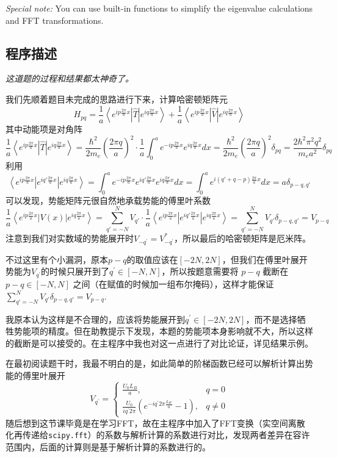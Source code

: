 \noindent \textit{Special note:} You can use built-in functions to simplify the eigenvalue calculations and FFT transformations.


\subsection{程序描述}
\textit{这道题的过程和结果都太神奇了。}

我们先顺着题目未完成的思路进行下来，计算哈密顿矩阵元
\[
H_{pq} = \frac{1}{a}\left\langle e^{ip\frac{2\pi}{a}x} \left| \hat{T} \right| e^{iq\frac{2\pi}{a}x} \right\rangle + \frac{1}{a}\left\langle e^{ip\frac{2\pi}{a}x} \left| \hat{V} \right| e^{iq\frac{2\pi}{a}x} \right\rangle
\]
其中动能项是对角阵
\[
    \frac{1}{a}\left\langle e^{ip\frac{2\pi}{a}x} \left| \hat{T} \right| e^{iq\frac{2\pi}{a}x} \right\rangle = \frac{\hbar^2}{2 m_e} \left( \frac{2\pi q}{a} \right)^2 \cdot\frac{1}{a}\int_0^a e^{-ip\frac{2\pi}{a}x} e^{iq\frac{2\pi}{a}x} dx= \frac{\hbar^2}{2 m_e} \left( \frac{2\pi q}{a} \right)^2 \delta_{pq} = \frac{2 \hbar^2 \pi^2 q^2}{m_e a^2} \delta_{pq}
\]
利用
\[
\left\langle e^{ip\frac{2\pi}{a}x} \left| e^{iq'\frac{2\pi}{a}x} \right| e^{iq\frac{2\pi}{a}x} \right\rangle = \int_0^a e^{-ip\frac{2\pi}{a}x} e^{iq'\frac{2\pi}{a}x} e^{iq\frac{2\pi}{a}x} dx = \int_0^a e^{i(q' + q - p)\frac{2\pi}{a}x} dx = a \delta_{p - q, q'}
\]
可以发现，势能矩阵元很自然地承载势能的傅里叶系数
\[
    \frac{1}{a}\left\langle e^{ip\frac{2\pi}{a}x} \left| V(x) \right| e^{iq\frac{2\pi}{a}x} \right\rangle = \sum_{q'=-N}^N V_{q'} \cdot \frac{1}{a} \left\langle e^{ip\frac{2\pi}{a}x} \left| e^{iq'\frac{2\pi}{a}x} \right| e^{iq\frac{2\pi}{a}x} \right\rangle=\sum_{q'=-N}^N V_{q'} \delta_{p - q, q'} = V_{p - q}
\]
注意到我们对实数域的势能展开时$V_{-q^{\prime}}=V_{-q^{\prime}}^{*}$，所以最后的哈密顿矩阵是厄米阵。


不过这里有个小漏洞，原本$p - q$的取值应该在$[-2N,2N]$，但我们在傅里叶展开势能为$V_{q^\prime}$的时候只展开到了$q^\prime \in [-N,N]$，所以按题意需要将 $p - q$ 截断在$ p - q  \in [-N,N]$ 之间（在赋值的时候加一组布尔掩码），这样才能保证$\sum_{q'=-N}^N V_{q'} \delta_{p - q, q'} = V_{p - q}.$

我原本认为这样是不合理的，应该将势能展开到$q^\prime \in [-2N,2N]$，而不是选择牺牲势能项的精度。但在助教提示下发现，本题的势能项本身影响就不大，所以这样的截断是可以接受的。在主程序中我也对这一点进行了对比论证，详见结果示例。

在最初阅读题干时，我最不明白的是，如此简单的阶梯函数已经可以解析计算出势能的傅里叶展开
\[
V_{q^{\prime}}=\begin{cases}\frac{U_0L_B}{a},&q=0\\\frac{U_0}{i{q^{\prime}}2\pi}\left(e^{-i{q^{\prime}}2\pi\frac{L_W}{a}}-1\right),&q\neq0\end{cases}
\]
随后想到这节课毕竟是在学习FFT，故在主程序中加入了FFT变换（实空间离散化再传递给\texttt{scipy.fft}）的系数与解析计算的系数进行对比，发现两者差异在容许范围内，后面的计算则是基于解析计算的系数进行的。

